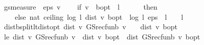 \begin{isabellebody}
\isamarkupfalse%
%
\endisatagproof
{\isafoldproof}%
%
\isadelimproof
\isanewline
%
\endisadelimproof
\isanewline
{}\isamarkupfalse%
\ {\isachardoublequoteopen}gs{\isacharunderscore}{\kern0pt}measure\ {\isasymequiv}\ {\isacharparenleft}{\kern0pt}{\isasymlambda}{\isacharparenleft}{\kern0pt}eps{\isacharcomma}{\kern0pt}\ v{\isacharparenright}{\kern0pt}{\isachardot}{\kern0pt}\isanewline
\ \ \ \ if\ v\ {\isacharequal}{\kern0pt}\ {\isasymnu}\isactrlsub b{\isacharunderscore}{\kern0pt}opt\ {\isasymor}\ l\ {\isacharequal}{\kern0pt}\ {}\isanewline
\ \ \ \ then\ {}\isanewline
\ \ \ \ else\ nat\ {\isacharparenleft}{\kern0pt}ceiling\ {\isacharparenleft}{\kern0pt}log\ {\isacharparenleft}{\kern0pt}{}{\isacharslash}{\kern0pt}l{\isacharparenright}{\kern0pt}\ {\isacharparenleft}{\kern0pt}dist\ v\ {\isasymnu}\isactrlsub b{\isacharunderscore}{\kern0pt}opt{\isacharparenright}{\kern0pt}\ {\isacharminus}{\kern0pt}\ log\ {\isacharparenleft}{\kern0pt}{}{\isacharslash}{\kern0pt}l{\isacharparenright}{\kern0pt}\ {\isacharparenleft}{\kern0pt}eps\ {\isacharasterisk}{\kern0pt}\ {\isacharparenleft}{\kern0pt}{}{\isacharminus}{\kern0pt}l{\isacharparenright}{\kern0pt}\ {\isacharslash}{\kern0pt}\ {\isacharparenleft}{\kern0pt}{}\ {\isacharasterisk}{\kern0pt}\ l{\isacharparenright}{\kern0pt}{\isacharparenright}{\kern0pt}{\isacharparenright}{\kern0pt}{\isacharparenright}{\kern0pt}{\isacharparenright}{\kern0pt}{\isachardoublequoteclose}\isanewline
\isanewline
{}\isamarkupfalse%
\ dist{\isacharunderscore}{\kern0pt}{\isasymL}\isactrlsub b{\isacharunderscore}{\kern0pt}split{\isacharunderscore}{\kern0pt}lt{\isacharunderscore}{\kern0pt}dist{\isacharunderscore}{\kern0pt}opt{\isacharcolon}{\kern0pt}\ {\isachardoublequoteopen}dist\ v\ {\isacharparenleft}{\kern0pt}GS{\isacharunderscore}{\kern0pt}rec{\isacharunderscore}{\kern0pt}fun\isactrlsub b\ v{\isacharparenright}{\kern0pt}\ {\isasymle}\ {}\ {\isacharasterisk}{\kern0pt}\ dist\ v\ {\isasymnu}\isactrlsub b{\isacharunderscore}{\kern0pt}opt{\isachardoublequoteclose}\isanewline
%
\isadelimproof
%
\endisadelimproof
%
\isatagproof
{}\isamarkupfalse%
\ {\isacharminus}{\kern0pt}\isanewline
\ \ \isamarkupfalse%
\ le{}{\isacharcolon}{\kern0pt}\ {\isachardoublequoteopen}dist\ v\ {\isacharparenleft}{\kern0pt}GS{\isacharunderscore}{\kern0pt}rec{\isacharunderscore}{\kern0pt}fun\isactrlsub b\ v{\isacharparenright}{\kern0pt}\ {\isasymle}\ dist\ v\ {\isasymnu}\isactrlsub b{\isacharunderscore}{\kern0pt}opt\ {\isacharplus}{\kern0pt}\ dist\ {\isacharparenleft}{\kern0pt}GS{\isacharunderscore}{\kern0pt}rec{\isacharunderscore}{\kern0pt}fun\isactrlsub b\ v{\isacharparenright}{\kern0pt}\ {\isasymnu}\isactrlsub b{\isacharunderscore}{\kern0pt}opt{\isachardoublequoteclose}\isanewline

\end{isabellebody}

